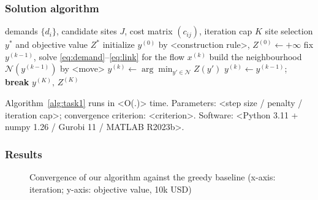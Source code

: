 \documentclass[12pt]{article}
\begin{document}
\subsubsection{Solution algorithm}
\begin{algorithm}[H]
  \caption{<Algorithm name> for Task 1}
  \label{alg:task1}
  \begin{algorithmic}[1]
    \Require demands $\{d_i\}$, candidate sites $J$, cost matrix $(c_{ij})$,
             iteration cap $K$
    \Ensure  site selection $y^{*}$ and objective value $Z^{*}$
    \State initialize $y^{(0)}$ by <construction rule>, $Z^{(0)} \gets +\infty$
      \State fix $y^{(k-1)}$, solve \eqref{eq:demand}--\eqref{eq:link}
             for the flow $x^{(k)}$
      \State build the neighbourhood $\mathcal{N}(y^{(k-1)})$ by <move>
        \State $y^{(k)} \gets \arg\min_{y' \in \mathcal{N}} Z(y')$
      \Else
        \State $y^{(k)} \gets y^{(k-1)}$; \textbf{break}
      \EndIf
    \EndFor
    \State \Return $y^{(K)},\, Z^{(K)}$
  \end{algorithmic}
\end{algorithm}

Algorithm~\ref{alg:task1} runs in <O(.)> time. Parameters:
<step size / penalty / iteration cap>; convergence criterion: <criterion>.
Software: <Python 3.11 + numpy 1.26 / Gurobi 11 / MATLAB R2023b>.

\subsubsection{Results}
\begin{figure}[htbp]
  \centering
  \caption{Convergence of our algorithm against the greedy baseline
           (x-axis: iteration; y-axis: objective value, 10k USD)}
  \label{fig:convergence}
\end{figure}
\end{document}
